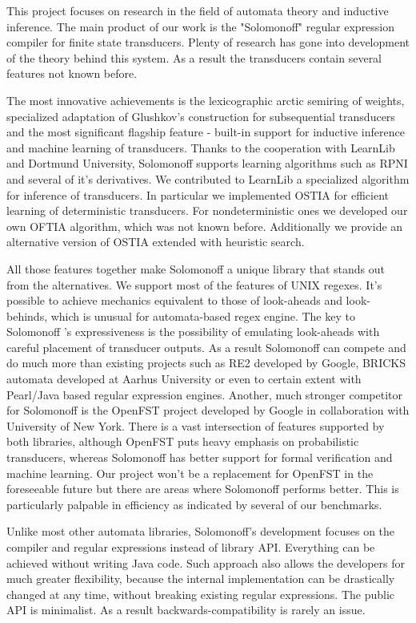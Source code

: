 
This project focuses on research in the field of automata theory and inductive inference.  The main product of our work is the "Solomonoff" regular expression compiler for finite state transducers. Plenty of research has gone into development of the theory behind this system. As a result the transducers contain several features not known before. 

The most innovative achievements is the lexicographic arctic semiring of weights\cite{MendozaDrosik2020MultitapeAA}, specialized adaptation of Glushkov's construction for subsequential transducers and the most significant flagship feature - built-in support for inductive inference and machine learning of transducers. Thanks to the cooperation with LearnLib and Dortmund University, Solomonoff supports learning algorithms such as RPNI and several of it's  derivatives. We contributed to LearnLib a specialized algorithm for inference of transducers. In particular we implemented OSTIA for efficient learning of deterministic transducers. For nondeterministic ones we developed our own OFTIA algorithm, which was not known before. Additionally we provide an alternative version of OSTIA extended with heuristic search.

All those features together make Solomonoff a unique library that stands out from the alternatives. We support most of the features of UNIX regexes. It's possible to achieve mechanics equivalent to those of look-aheads and look-behinds, which is unusual for automata-based regex engine. The key to Solomonoff 's expressiveness is the possibility of emulating look-aheads with careful placement of transducer outputs. As a result Solomonoff can compete and  do much more than existing projects such as RE2 developed by Google, BRICKS automata developed at Aarhus University or even to certain extent with Pearl/Java based regular expression engines. Another, much stronger competitor for Solomonoff is the OpenFST project developed by Google in collaboration with University of New York. There is a vast intersection of features supported by both libraries, although OpenFST puts heavy emphasis on probabilistic transducers, whereas Solomonoff has better support for formal verification and machine learning. Our project won't be a replacement for OpenFST in the foreseeable future but there are areas where Solomonoff performs better. This is particularly palpable in efficiency as indicated by several of our benchmarks.

Unlike most other automata libraries, Solomonoff's development focuses on the compiler and regular expressions instead of library API. Everything can be achieved without writing Java code. Such approach also allows the developers for much greater flexibility, because the internal implementation can be drastically changed at any time, without breaking existing regular expressions. The public API is minimalist. As a result backwards-compatibility is rarely an issue.  

